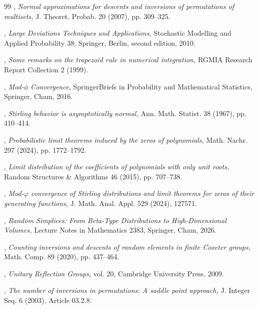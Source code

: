 \documentclass[11pt,a4paper]{scrartcl}
\numberwithin{equation}{section}
\theoremstyle{plain}
\theoremstyle{definition}
\theoremstyle{remark}
\begin{document}
\begin{thebibliography}{99}
,
{\it Normal approximations for descents and inversions of permutations of multisets,}
J. Theoret. Probab. 20 (2007), pp. 309--325.

,
{\it Large Deviations Techniques and Applications,}
Stochastic Modelling and Applied Probability 38, Springer, Berlin, second edition, 2010.

,
{\it Some remarks on the trapezoid rule in numerical integration,}
RGMIA Research Report Collection 2 (1999).

,
{\it Mod-$\phi$ Convergence,}
SpringerBriefs in Probability and Mathematical Statistics, Springer, Cham, 2016.

,
{\it Stirling behavior is asymptotically normal,}
Ann. Math. Statist. 38 (1967), pp. 410--414.

,
{\it Probabilistic limit theorems induced by the zeros of polynomials,}
Math. Nachr. 297 (2024), pp. 1772--1792.

,
{\it Limit distribution of the coefficients of polynomials with only unit roots,}
Random Structures \& Algorithms 46 (2015), pp. 707--738.

,
{\it Mod-$\varphi$ convergence of Stirling distributions and limit theorems for zeros of their generating functions,}
J. Math. Anal. Appl. 529 (2024), 127571.

,
{\it Random Simplices: From Beta-Type Distributions to High-Dimensional Volumes,}
Lecture Notes in Mathematics 2383, Springer, Cham, 2026.

,
{\it Counting inversions and descents of random elements in finite Coxeter groups,}
Math. Comp. 89 (2020), pp. 437--464.

,
{\it Unitary Reflection Groups,}
vol. 20, Cambridge University Press, 2009.

,
{\it The number of inversions in permutations: A saddle point approach,}
J. Integer Seq. 6 (2003), Article 03.2.8.


\end{thebibliography}
\end{document}
